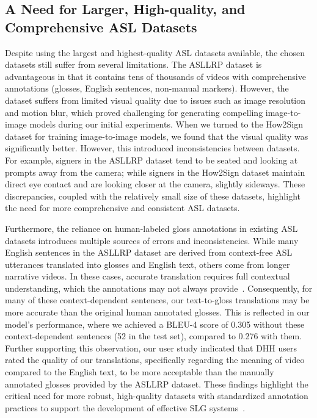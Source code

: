 \subsection{A Need for Larger, High-quality, and Comprehensive ASL Datasets}

Despite using the largest and highest-quality ASL datasets available, the chosen datasets still suffer from several limitations. The ASLLRP dataset is advantageous in that it contains tens of thousands of videos with comprehensive annotations (\eg glosses, English sentences, non-manual markers). However, the dataset suffers from limited visual quality due to issues such as image resolution and motion blur, which proved challenging for generating compelling image-to-image models during our initial experiments. When we turned to the How2Sign dataset for training image-to-image models, we found that the visual quality was significantly better. However, this introduced inconsistencies between datasets. For example, signers in the ASLLRP dataset tend to be seated and looking at prompts away from the camera; while signers in the How2Sign dataset maintain direct eye contact and are looking closer at the camera, slightly sideways. These discrepancies, coupled with the relatively small size of these datasets, highlight the need for more comprehensive and consistent ASL datasets.

Furthermore, the reliance on human-labeled gloss annotations in existing ASL datasets introduces multiple sources of errors and inconsistencies. 
While many English sentences in the ASLLRP dataset are derived from context-free ASL utterances translated into glosses and English text, others come from longer narrative videos. In these cases, accurate translation requires full contextual understanding, which the annotations may not always provide~\cite{tanzer2024reconsidering}. Consequently, for many of these context-dependent sentences, our text-to-gloss translations may be more accurate than the original human annotated glosses. This is reflected in our model's performance, where we achieved a BLEU-4 score of 0.305 without these context-dependent sentences (52 in the test set), compared to 0.276 with them. Further supporting this observation, our user study indicated that DHH users rated the quality of our translations, specifically regarding the meaning of video compared to the English text, to be more acceptable than the manually annotated glosses provided by the ASLLRP dataset. These findings highlight the critical need for more robust, high-quality datasets with standardized annotation practices to support the development of effective SLG systems~\cite{bragg_sign_2019}.

